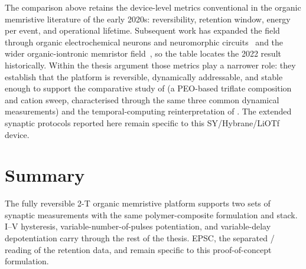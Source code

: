 \documentclass[12pt, twoside]{report}
\begin{document}
The comparison above retains the device-level metrics conventional in the organic memristive literature of the early 2020s: reversibility, retention window, energy per event, and operational lifetime. Subsequent work has expanded the field through organic electrochemical neurons and neuromorphic circuits~\cite{Harikesh2024OECNReview,Krauhausen2024Robotics} and the wider organic-iontronic memristor field~\cite{Xia2024OIMReview}, so the table locates the 2022 result historically. Within the thesis argument those metrics play a narrower role: they establish that the platform is reversible, dynamically addressable, and stable enough to support the comparative study of  (a PEO-based triflate composition and cation sweep, characterised through the same three common dynamical measurements) and the temporal-computing reinterpretation of . The extended synaptic protocols reported here remain specific to this SY/Hybrane/LiOTf device.


\section{Summary}\label{sec:ch2_summary}

The fully reversible 2-T organic memristive platform supports two sets of synaptic measurements with the same polymer-composite formulation and stack. I--V hysteresis, variable-number-of-pulses potentiation, and variable-delay depotentiation carry through the rest of the thesis. EPSC, the separated \STM{}/\LTM{} reading of the retention data, and \STDP{} remain specific to this proof-of-concept formulation.
\end{document}
